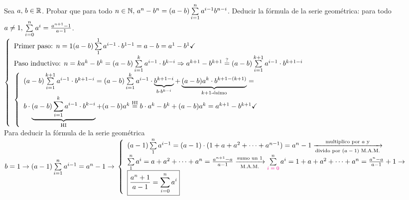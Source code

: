 \documentclass[12pt,a4paper, spanish]{article}
\begin{document}
\ejercicio
Sea $a,\, b \in \mathbb R$. Probar que para todo $n \in \mathbb N,\, a^n - b^n = (a-b) \sum\limits_{i = 1}^{n}a^{i-1}b^{n-i}$. Deducir la fórmula de la serie
geométrica: para todo $a \neq 1,\, \sum\limits_{i = 0}^{n}a^i = \frac{a^{n+1} - 1}{a-1}$.\\
$\llave{ l }{
		\text{Primer paso: } n = 1 (a-b) \sumatoria{1}{1} a^{i-1} \cdot b^{1-1} = a - b = a^1 - b^1 \checkmark\\
		\text{Paso inductivo: } n = k  a^k - b^k = (a-b) \sumatoria{i = 1}{k} a^{i-1} \cdot b^{k-i} \entonces
		a^{k+1} - b^{k+1} \eq?= (a-b) \sumatoria{i = 1}{k+1} a^{i-1} \cdot b^{k+1-i}\\
		\llave{l}{
			(a-b) \sumatoria{i = 1}{k+1} a^{i-1} \cdot b^{k+1-i} =
			(a-b) \sumatoria{i = 1}{k} a^{i-1} \cdot \underbrace{b^{k+1-i}}_{b\cdot b^{k-i}} + 
      \kmasuno{
        (a - b) a^k \cdot b^{k+1-(k+1)}
      } = \\
			b \cdot 
      \HI{
				(a-b) \sumatoria{i = 1}{k} a^{i-1} \cdot b^{k-i}
			} + (a - b) a^k \eqHI= b \cdot a^k - b^k + (a - b) a^k = a^{k+1} - b^{k+1}\checkmark
		}\\
	}$\\
Para deducir la fórmula de la serie geométrica $b = 1 \to (a-1) \sumatoria{i=1}{n} a^{i-1} = a^n - 1 \to\\
	\llave{ l }{
		(a-1) \sumatoria{1}{n} a^{i-1} =(a-1) \cdot (1 + a + a^2 + \cdots + a^{n-1})  = a^n - 1 \flecha{multiplico por $a$ y}[divido por $(a - 1)$ M.A.M.]\\
		\sumatoria{1}{n} a^i = a + a^2 + \cdots + a^n  = \frac{a^{n+1} - a}{a-1} \flecha{sumo un $1$}[M.A.M.]
		\sumatoria{\magenta{$i = 0$}}{n} a^i = 1 + a + a^2 + \cdots + a^n   = \frac{a^n - a}{a-1} + 1 \to\\
		\boxed{ \frac{a^n + 1}{a-1} =  \sumatoria{i = 0}{n} a^i  }
	}$

\ejercicio

\ejercicio

\ejercicio

\ejercicio

\ejercicio
\end{document}
